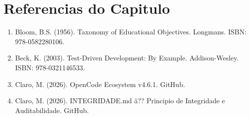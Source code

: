 \section{Referencias do Capitulo}

\begin{enumerate}[nosep]
 \item Bloom, B.S. (1956). Taxonomy of Educational Objectives.
 Longmans. ISBN: 978-0582280106.
 \item Beck, K. (2003). Test-Driven Development: By Example.
 Addison-Wesley. ISBN: 978-0321146533.
 \item Claro, M. (2026). OpenCode Ecosystem v4.6.1. GitHub.
 \item Claro, M. (2026). INTEGRIDADE.md \^a?? Principio de Integridade
 e Auditabilidade. GitHub.
\end{enumerate}
